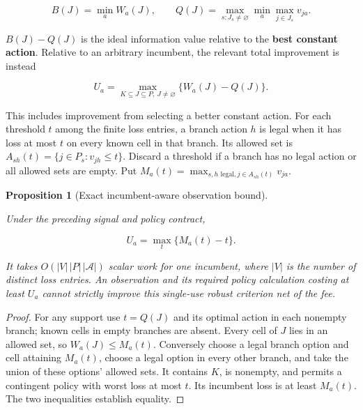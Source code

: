 \documentclass{article}
\newtheorem{proposition}[theorem]{Proposition}
\theoremstyle{definition}
\begin{document}
\begin{equation}
B(J)=\min_a W_a(J),\qquad
 Q(J)=\max_{s:J_s\ne\varnothing}\min_a\max_{j\in J_s}v_{ja}.
 \label{eq-observation}
\end{equation}

\(B(J)-Q(J)\) is the ideal information value relative to the
\textbf{best constant action}. Relative to an arbitrary incumbent, the
relevant total improvement is instead

\begin{equation}
U_a=\max_{K\subseteq J\subseteq P,\ J\ne\varnothing}
             \{W_a(J)-Q(J)\}.
 \label{eq-incumbent}
\end{equation}

This includes improvement from selecting a better constant action. For
each threshold \(t\) among the finite loss entries, a branch action
\(h\) is legal when it has loss at most \(t\) on every known cell in
that branch. Its allowed set is \(A_{sh}(t)=\{j\in P_s:v_{jh}\leq t\}\).
Discard a threshold if a branch has no legal action or all allowed sets
are empty. Put \(M_a(t)=\max_{s,h\text{ legal},j\in A_{sh}(t)}v_{ja}\).

\begin{proposition}[Exact incumbent-aware observation bound]\label{prop-observation}

Under the preceding signal and policy contract,

\begin{equation}
U_a=\max_t\{M_a(t)-t\}.
 \label{eq-observation-threshold}
\end{equation}

It takes \(O(|V|\,|P|\,|\mathcal A|)\) scalar work for one incumbent,
where \(|V|\) is the number of distinct loss entries. An observation and
its required policy calculation costing at least \(U_a\) cannot strictly
improve this single-use robust criterion net of the fee.

\end{proposition}

\begin{proof}

For any support use \(t=Q(J)\) and its optimal action in each nonempty
branch; known cells in empty branches are absent. Every cell of \(J\)
lies in an allowed set, so \(W_a(J)\leq M_a(t)\). Conversely choose a
legal branch option and cell attaining \(M_a(t)\), choose a legal option
in every other branch, and take the union of these options' allowed
sets. It contains \(K\), is nonempty, and permits a contingent policy
with worst loss at most \(t\). Its incumbent loss is at least
\(M_a(t)\). The two inequalities establish equality.
\end{proof}
\end{document}
